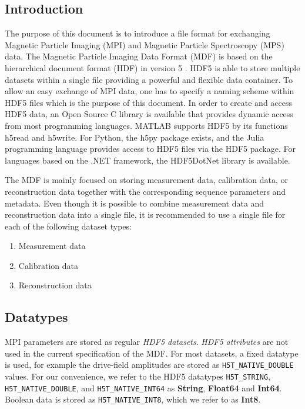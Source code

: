 \documentclass[landscape,a4paper]{article} %
\newcommand{\inl}[1]{\lstinline[columns=fixed]{#1}}
\newcommand{\inltab}[1]{{\ttfamily\bfseries\color{blue}#1}}
\newcommand{\inlvar}[1]{{\ttfamily#1}}
\begin{document}
\begin{multicols}{2}%

\section{Introduction} \label{Sec:Introduction}

The purpose of this document is to introduce a file format for exchanging Magnetic Particle Imaging (MPI) and Magnetic Particle Spectroscopy (MPS) data. The Magnetic Particle Imaging Data Format (MDF) is based on the hierarchical document format (HDF) in version 5 \cite{hdf5}. HDF5 is able to store multiple datasets within a single file providing a powerful and flexible data container. To allow an easy exchange of MPI data, one has to specify a naming scheme within HDF5 files which is the purpose of this document. In order to create and access HDF5 data, an Open Source C library is available that provides dynamic access from most programming languages. MATLAB supports HDF5 by its functions \inlvar{h5read} and \inlvar{h5write}. For Python, the \inlvar{h5py} package exists, and the Julia programming language provides access to HDF5 files via the \inlvar{HDF5} package. For languages based on the .NET framework, the \inlvar{HDF5DotNet} library is available.

The MDF is mainly focused on storing measurement data, calibration data, or reconstruction data together with the corresponding sequence parameters and metadata. Even though it is possible to combine measurement data and reconstruction data into a single file, it is recommended to use a single file for each of the following dataset types:
\begin{enumerate}
\setlength{\itemsep}{0pt}
\item Measurement data
\item Calibration data
\item Reconstruction data
\end{enumerate}

\subsection{Datatypes}

MPI parameters are stored as regular \textit{HDF5 datasets}. \textit{HDF5 attributes} are not used in the current specification of the MDF. For most datasets, a fixed datatype is used, for example the drive-field amplitudes are stored as \inl{H5T_NATIVE_DOUBLE} values. For our convenience, we refer to the HDF5 datatypes \inl{H5T_STRING}, \inl{H5T_NATIVE_DOUBLE}, and \inl{H5T_NATIVE_INT64} as \inltab{String}, \inltab{Float64} and \inltab{Int64}. Boolean data is stored as \inl{H5T_NATIVE_INT8}, which we refer to as \inltab{Int8}.


\end{multicols}
\end{document}
